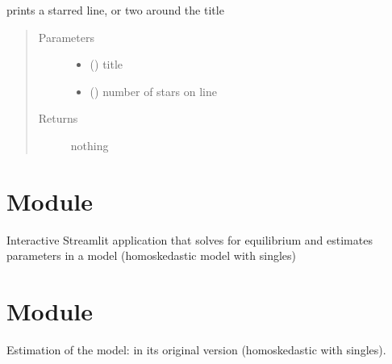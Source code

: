 \documentclass[letterpaper,10pt,english]{sphinxmanual}
\begin{document}
\begin{fulllineitems}
\label{\detokenize{ipfp_utils:ipfp_utils.print_stars}}
prints a starred line, or two around the title
\begin{quote}\begin{description}
\item[{Parameters}] \leavevmode\begin{itemize}
\item {} 
 () \textendash{} title

\item {} 
 () \textendash{} number of stars on line

\end{itemize}

\item[{Returns}] \leavevmode
nothing

\end{description}\end{quote}

\end{fulllineitems}



\chapter{Module }
\label{\detokenize{ipfp_ex_str:module-ipfp_ex_str}}\label{\detokenize{ipfp_ex_str:module-ipfp-ex-str}}\label{\detokenize{ipfp_ex_str::doc}}
Interactive Streamlit application that solves for equilibrium and estimates parameters     in a  model         (homoskedastic model with singles)


\chapter{Module }
\label{\detokenize{estimate_cs_fuvl:module-estimate_cs_fuvl}}\label{\detokenize{estimate_cs_fuvl:module-estimate-cs-fuvl}}\label{\detokenize{estimate_cs_fuvl::doc}}
Estimation of the  model:
in its original version (homoskedastic with singles).
\end{document}
